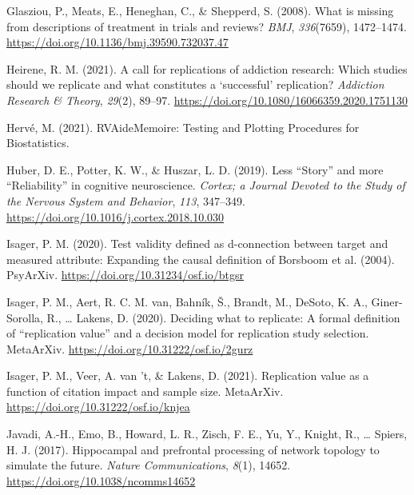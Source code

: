 \documentclass[
  english,
  man,floatsintext]{apa6}
\newlength{\cslhangindent}
\newlength{\cslentryspacingunit} %
\newenvironment{CSLReferences}[2] %
 {%
  \setlength{\parindent}{0pt}
  \ifodd #1
  \let\oldpar\par
  \def\par{\hangindent=\cslhangindent\oldpar}
  \fi
  \setlength{\parskip}{#2\cslentryspacingunit}
 }%
 {}
\begin{document}
\begin{CSLReferences}{1}{0}
\leavevmode{}%
Glasziou, P., Meats, E., Heneghan, C., \& Shepperd, S. (2008). What is missing from descriptions of treatment in trials and reviews? \emph{BMJ}, \emph{336}(7659), 1472--1474. \url{https://doi.org/10.1136/bmj.39590.732037.47}

\leavevmode{}%
Heirene, R. M. (2021). A call for replications of addiction research: Which studies should we replicate and what constitutes a {`successful'} replication? \emph{Addiction Research \& Theory}, \emph{29}(2), 89--97. \url{https://doi.org/10.1080/16066359.2020.1751130}

\leavevmode{}%
Hervé, M. (2021). {RVAideMemoire}: {Testing} and {Plotting Procedures} for {Biostatistics}.

\leavevmode{}%
Huber, D. E., Potter, K. W., \& Huszar, L. D. (2019). Less {``{Story}''} and more {``{Reliability}''} in cognitive neuroscience. \emph{Cortex; a Journal Devoted to the Study of the Nervous System and Behavior}, \emph{113}, 347--349. \url{https://doi.org/10.1016/j.cortex.2018.10.030}

\leavevmode{}%
Isager, P. M. (2020). Test validity defined as d-connection between target and measured attribute: {Expanding} the causal definition of {Borsboom} et al. (2004). {PsyArXiv}. \url{https://doi.org/10.31234/osf.io/btgsr}

\leavevmode{}%
Isager, P. M., Aert, R. C. M. van, Bahník, Š., Brandt, M., DeSoto, K. A., Giner-Sorolla, R., \ldots{} Lakens, D. (2020). Deciding what to replicate: {A} formal definition of {``replication value''} and a decision model for replication study selection. {MetaArXiv}. \url{https://doi.org/10.31222/osf.io/2gurz}

\leavevmode{}%
Isager, P. M., Veer, A. van 't, \& Lakens, D. (2021). Replication value as a function of citation impact and sample size. {MetaArXiv}. \url{https://doi.org/10.31222/osf.io/knjea}

\leavevmode{}%
Javadi, A.-H., Emo, B., Howard, L. R., Zisch, F. E., Yu, Y., Knight, R., \ldots{} Spiers, H. J. (2017). Hippocampal and prefrontal processing of network topology to simulate the future. \emph{Nature Communications}, \emph{8}(1), 14652. \url{https://doi.org/10.1038/ncomms14652}


\end{CSLReferences}
\end{document}
